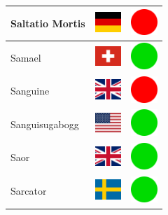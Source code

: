 \documentclass[12pt, a4paper, twoside]{report}
\begin{document}
\begin{center}
\begin{longtable}{|p{5cm}|p{2cm}|p{2cm}|}
 Saltatio Mortis                                            & \includegraphics[width=1cm]{../4x3/de} &   \includegraphics[width=1cm]{../likes/n} \\ \hline
 Samael                                                     & \includegraphics[width=1cm]{../4x3/ch} &   \includegraphics[width=1cm]{../likes/y} \\ \hline
 Sanguine                                                   & \includegraphics[width=1cm]{../4x3/gb} &   \includegraphics[width=1cm]{../likes/n} \\ \hline
 Sanguisugabogg                                             & \includegraphics[width=1cm]{../4x3/us} &   \includegraphics[width=1cm]{../likes/y} \\ \hline
 Saor                                                       & \includegraphics[width=1cm]{../4x3/gb} &   \includegraphics[width=1cm]{../likes/y} \\ \hline
 Sarcator                                                   & \includegraphics[width=1cm]{../4x3/se} &   \includegraphics[width=1cm]{../likes/y} \\ \hline

\end{longtable}
\end{center}
\end{document}
